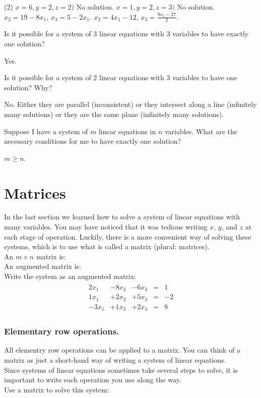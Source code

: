 \documentclass[12pt,fleqn]{book}
\newcommand{\prb}[1]{\begin{Exercise}#1\end{Exercise}}
\newcommand{\sol}[1]{\begin{Answer}#1\end{Answer}}
\begin{document}
\sol{
\begin{tasks}(2)
	\task $x=6, y=2, z=2)$
	\task No solution.
	\task $x=1, y=2, z=3)$
	\task No solution.
	\task $x_2=19-8x_1$, $x_3=5-2x_1$.
	\task $x_2=4x_1-12$, $x_3=\frac{9x_1-27}{2}$.
\end{tasks}
}
\clearpage
\prb{Is it possible for a system of 3 linear equations with 3 variables to have exactly one solution?}
\sol{Yes.}
\vspace{2in}
\prb{Is it possible for a system of 2 linear equations with 3 variables to have one solution?  Why?}
\sol{No.  Either they are parallel (inconsistent) or they intersect along a line (infinitely many solutions) or they are the same plane (infinitely many solutions).}
\vspace{2in}
\prb{Suppose I have a system of $m$ linear equations in $n$ variables.  What are the necessary conditions for me to have exactly one solution?}
\sol{$m\ge n$.}

\chapter{Matrices}
In the last section we learned how to solve a system of linear equations with many variables.  You may have noticed that it was tedious writing $x$, $y$, and $z$ at each stage of operation.  Luckily, there is a more convenient way of solving these systems, which is to use what is called a matrix (plural: matrices).
\\[1em]
An $m\times n$ matrix is:
\\[2in]
An augmented matrix is:
\\[2in]
Write the system as an augmented matrix:
\begin{align*}
\begin{array}{rrrrr}
	2 x_{1}&- 8x_{2} & -6x_{3}&=&1 \\
	1 x_{1}&+ 2x_{2} & +5x_{3}&=&-2 \\
	-3x_{1}&+ 1x_{2} & +2x_{3}&=&8
\end{array}
\end{align*}
\clearpage
\subsection*{Elementary row operations.}
All elementry row operations can be applied to a matrix.  You can think of a matrix as just a short-hand way of writing a system of linear equations.  \\[1em]
Since systems of linear equations sometimes take several steps to solve, it is important to write each operation you use along the way.
\\[1em]
Use a matrix to solve this system:
\end{document}
